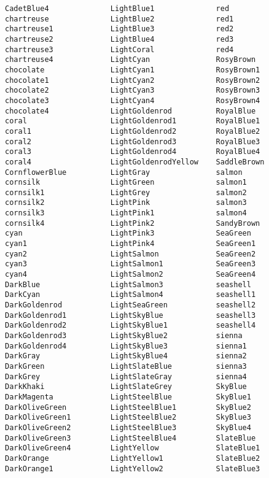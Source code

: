 \documentclass{book}
\begin{document}
\begin{verbatim}
CadetBlue4              LightBlue1              red
chartreuse              LightBlue2              red1
chartreuse1             LightBlue3              red2
chartreuse2             LightBlue4              red3
chartreuse3             LightCoral              red4
chartreuse4             LightCyan               RosyBrown
chocolate               LightCyan1              RosyBrown1
chocolate1              LightCyan2              RosyBrown2
chocolate2              LightCyan3              RosyBrown3
chocolate3              LightCyan4              RosyBrown4
chocolate4              LightGoldenrod          RoyalBlue
coral                   LightGoldenrod1         RoyalBlue1
coral1                  LightGoldenrod2         RoyalBlue2
coral2                  LightGoldenrod3         RoyalBlue3
coral3                  LightGoldenrod4         RoyalBlue4
coral4                  LightGoldenrodYellow    SaddleBrown
CornflowerBlue          LightGray               salmon
cornsilk                LightGreen              salmon1
cornsilk1               LightGrey               salmon2
cornsilk2               LightPink               salmon3
cornsilk3               LightPink1              salmon4
cornsilk4               LightPink2              SandyBrown
cyan                    LightPink3              SeaGreen
cyan1                   LightPink4              SeaGreen1
cyan2                   LightSalmon             SeaGreen2
cyan3                   LightSalmon1            SeaGreen3
cyan4                   LightSalmon2            SeaGreen4
DarkBlue                LightSalmon3            seashell
DarkCyan                LightSalmon4            seashell1
DarkGoldenrod           LightSeaGreen           seashell2
DarkGoldenrod1          LightSkyBlue            seashell3
DarkGoldenrod2          LightSkyBlue1           seashell4
DarkGoldenrod3          LightSkyBlue2           sienna
DarkGoldenrod4          LightSkyBlue3           sienna1
DarkGray                LightSkyBlue4           sienna2
DarkGreen               LightSlateBlue          sienna3
DarkGrey                LightSlateGray          sienna4
DarkKhaki               LightSlateGrey          SkyBlue
DarkMagenta             LightSteelBlue          SkyBlue1
DarkOliveGreen          LightSteelBlue1         SkyBlue2
DarkOliveGreen1         LightSteelBlue2         SkyBlue3
DarkOliveGreen2         LightSteelBlue3         SkyBlue4
DarkOliveGreen3         LightSteelBlue4         SlateBlue
DarkOliveGreen4         LightYellow             SlateBlue1
DarkOrange              LightYellow1            SlateBlue2
DarkOrange1             LightYellow2            SlateBlue3

\end{verbatim}
\end{document}
